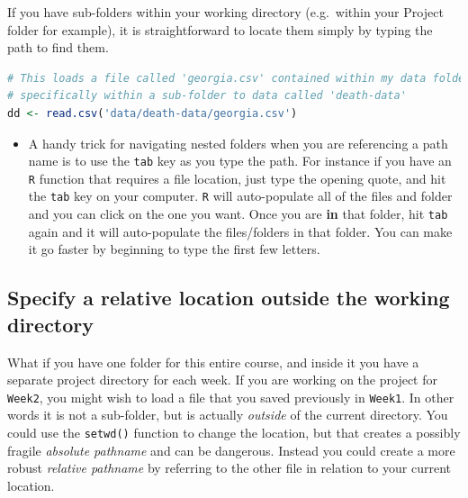 \documentclass[
]{book}
\newcommand{\passthrough}[1]{#1}
\newenvironment{rmdblock}[1]
  {%
  \begin{itemize}
  \renewcommand{\labelitemi}{
    \raisebox{-.7\height}[0pt][0pt]{
      {\setkeys{Gin}{width=3em,keepaspectratio}\texttt{[image: images/\#1]}}
    }
  }
  \item
  }
  {
  \end{itemize}
  }
\newenvironment{rmdtip}
  {\begin{rmdblock}{tip}}
  {\end{rmdblock}}
\begin{document}
If you have sub-folders within your working directory (e.g.~within your Project folder for example), it is straightforward to locate them simply by typing the path to find them.

\begin{lstlisting}[language=R]
# This loads a file called 'georgia.csv' contained within my data folder, and
# specifically within a sub-folder to data called 'death-data'
dd <- read.csv('data/death-data/georgia.csv')
\end{lstlisting}

\begin{rmdtip}
A handy trick for navigating nested folders when you are referencing a path name is to use the \passthrough{\lstinline!tab!} key as you type the path. For instance if you have an \passthrough{\lstinline!R!} function that requires a file location, just type the opening quote, and hit the \passthrough{\lstinline!tab!} key on your computer. \passthrough{\lstinline!R!} will auto-populate all of the files and folder and you can click on the one you want. Once you are \textbf{in} that folder, hit \passthrough{\lstinline!tab!} again and it will auto-populate the files/folders in that folder. You can make it go faster by beginning to type the first few letters.
\end{rmdtip}

\hypertarget{specify-a-relative-location-outside-the-working-directory}{%
\subsection*{Specify a relative location outside the working directory}\label{specify-a-relative-location-outside-the-working-directory}}

What if you have one folder for this entire course, and inside it you have a separate project directory for each week. If you are working on the project for \passthrough{\lstinline!Week2!}, you might wish to load a file that you saved previously in \passthrough{\lstinline!Week1!}. In other words it is not a sub-folder, but is actually \emph{outside} of the current directory. You could use the \passthrough{\lstinline!setwd()!} function to change the location, but that creates a possibly fragile \emph{absolute pathname} and can be dangerous. Instead you could create a more robust \emph{relative pathname} by referring to the other file in relation to your current location.
\end{document}
